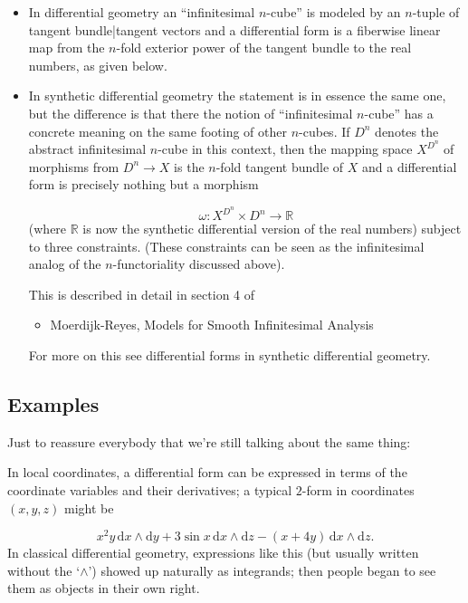 \documentclass[preprint, 5p, 10pt]{elsarticle}
\theoremstyle{plain}
\begin{document}
\begin{itemize}%
\item In differential geometry an ``{}infinitesimal $n$-cube''{} is modeled by an $n$-tuple of tangent bundle|tangent vectors and a differential form is a fiberwise linear map from the $n$-fold exterior power of the tangent bundle to the real numbers, as given below.


\item In synthetic differential geometry the statement is in essence the same one, but the difference is that there the notion of ``{}infinitesimal $n$-cube''{} has a concrete meaning on the same footing of other $n$-cubes. If $D^n$ denotes the abstract infinitesimal $n$-cube in this context, then the mapping space $X^{D^n}$ of morphisms from $D^n\to X$ is the $n$-fold tangent bundle of $X$ and a differential form is precisely nothing but a morphism

\begin{displaymath}
\omega : X^{D^n} \times D^n \to \mathbb{R}
\end{displaymath}
(where $\mathbb{R}$ is now the synthetic differential version of the real numbers) subject to three constraints. (These constraints can be seen as the infinitesimal analog of the $n$-functoriality discussed above).

This is described in detail in section 4 of

\begin{itemize}%
\item Moerdijk-Reyes, Models for Smooth Infinitesimal Analysis

\end{itemize}
For more on this see differential forms in synthetic differential geometry.



\end{itemize}
\hypertarget{examples_4}{}\subsection*{{Examples}}\label{examples_4}

Just to reassure everybody that we'{}re still talking about the same thing:

In local coordinates, a differential form can be expressed in terms of the coordinate variables and their derivatives; a typical $2$-form in coordinates $(x,y,z)$ might be

\begin{displaymath}
x^2 y\, \mathrm{d}x \wedge \mathrm{d}y + 3 \sin x\, \mathrm{d}x \wedge \mathrm{d}z - (x + 4 y)\, \mathrm{d}x \wedge \mathrm{d}z .
\end{displaymath}
In classical differential geometry, expressions like this (but usually written without the ‘$\wedge$’) showed up naturally as integrands; then people began to see them as objects in their own right.
\end{document}
